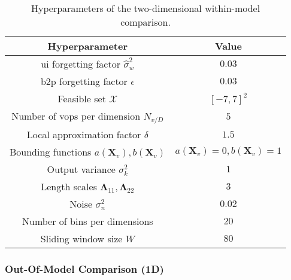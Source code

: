 \bgroup
\def\arraystretch{1}
\begin{table}[h]
    \small
    \centering
    \begin{tabular}{c||c}
        \textbf{Hyperparameter} & \textbf{Value} \\\hline\hline
        \gls{ui} forgetting factor $\hat{\sigma}_w^2$ & $0.03$\\
        \gls{b2p} forgetting factor $\epsilon$ & $0.03$\\
        Feasible set $\mathcal{X}$ & $[-7,7]^2$\\
        Number of \glspl{vop} per dimension $N_{v/D}$ & $5$\\
        Local approximation factor $\delta$ & $1.5$\\
        Bounding functions $a(\mathbf{X}_v),b(\mathbf{X}_v)$ & $a(\mathbf{X}_v)=0,b(\mathbf{X}_v)=1$\\
        Output variance $\sigma_k^2$ & $1$\\
        Length scales $\boldsymbol\Lambda_{11}, \boldsymbol\Lambda_{22}$ & $3$\\
        Noise $\sigma_n^2$ & $0.02$ \\
        Number of bins per dimensions & $20$ \\
        Sliding window size $W$ & $80$
    \end{tabular}
    \caption{Hyperparameters of the two-dimensional within-model comparison.}
    \label{tab:params_WMC_2D}
\end{table}
\egroup

\subsubsection{Out-Of-Model Comparison (1D)}

